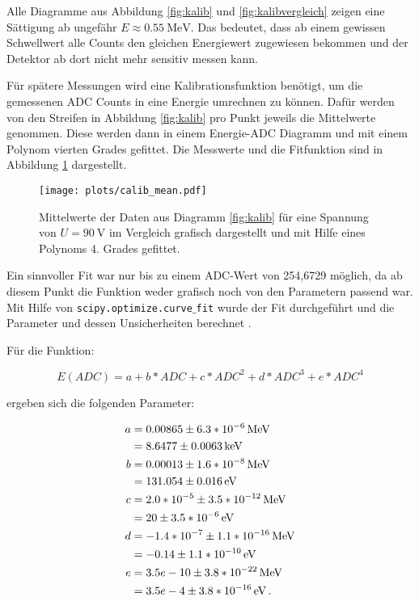 Alle Diagramme aus Abbildung \ref{fig:kalib} und \ref{fig:kalibvergleich} 
zeigen eine Sättigung ab ungefähr $E \approx \SI{0.55}{\mega\electronvolt}$. 
Das bedeutet, dass ab einem gewissen Schwellwert alle Counts den gleichen 
Energiewert zugewiesen bekommen und der Detektor ab dort nicht mehr sensitiv 
messen kann. \par \medskip 

Für spätere Messungen wird eine Kalibrationsfunktion benötigt, um die gemessenen 
ADC Counts in eine Energie umrechnen zu können. Dafür werden von den Streifen 
in Abbildung \ref{fig:kalib} pro Punkt jeweils die Mittelwerte genommen. Diese 
werden dann in einem Energie-ADC Diagramm und mit einem Polynom vierten Grades 
gefittet. Die Messwerte und die Fitfunktion sind in Abbildung 
\ref{fig:kalibfunktion} dargestellt.

\begin{figure}[H]
  \centering
  \texttt{[image: plots/calib\_mean.pdf]}
  \caption{Mittelwerte der Daten aus Diagramm \ref{fig:kalib} für eine 
  Spannung von $U = \SI{90}{\volt}$ im Vergleich grafisch dargestellt 
  und mit Hilfe eines Polynoms 4. Grades gefittet.}
  \label{fig:kalibfunktion}
\end{figure}

Ein sinnvoller Fit war nur bis zu einem ADC-Wert von 254,6729 möglich, da 
ab diesem Punkt die Funktion weder grafisch noch von den Parametern passend war. 
Mit Hilfe von \texttt{scipy.optimize.curve$\_$fit} wurde der Fit durchgeführt und die 
Parameter und dessen Unsicherheiten berechnet .\par 
Für die Funktion: 

\begin{equation}
E \left(ADC  \right) = a + b * ADC + c * ADC^2 + d * ADC^3 + e * ADC^4
\label{eqn:kalib}
\end{equation}

ergeben sich die folgenden Parameter: 

\begin{align*}
    a &= \SI[parse-numbers=false]{0.00865  \pm   6.3*10^{-6}}{\mega\electronvolt} \\
      &= \SI[parse-numbers=false]{8.6477 \pm 0.0063}{\kilo\electronvolt} \\
    b &= \SI[parse-numbers=false]{0.00013  \pm   1.6*10^{-8}}{\mega\electronvolt} \\
      &= \SI[parse-numbers=false]{131.054 \pm 0.016}{\electronvolt} \\
    c &= \SI[parse-numbers=false]{2.0*10^{-5}  \pm   3.5*10^{-12}}{\mega\electronvolt} \\
      &= \SI[parse-numbers=false]{20 \pm 3.5*10^{-6}}{\electronvolt} \\
    d &= \SI[parse-numbers=false]{-1.4*10^{-7}  \pm   1.1*10^{-16}}{\mega\electronvolt} \\
      &= \SI[parse-numbers=false]{-0.14 \pm 1.1*10^{-10}}{\electronvolt} \\
    e &= \SI[parse-numbers=false]{3.5e-10  \pm   3.8*10^{-22}}{\mega\electronvolt} \\
      &= \SI[parse-numbers=false]{3.5e-4 \pm 3.8*10^{-16}}{\electronvolt} \, . \\
\end{align*}
